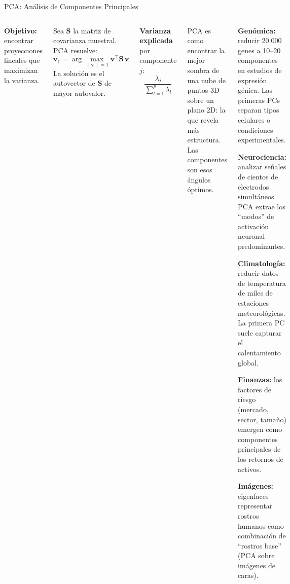 \documentclass[aspectratio=169]{beamer}
\begin{document}
\begin{frame}{PCA: Análisis de Componentes Principales}
\begin{columns}[T]
\textbf{Objetivo:} encontrar proyecciones lineales que maximizan la varianza.

\medskip
Sea $\mathbf{S}$ la matriz de covarianza muestral. PCA resuelve:
\[
\mathbf{v}_1 = \arg\max_{\|\mathbf{v}\|=1} \mathbf{v}^\top \mathbf{S}\, \mathbf{v}
\]
La solución es el autovector de $\mathbf{S}$ de mayor autovalor.

\medskip
\textbf{Varianza explicada} por componente $j$:
\[
\frac{\lambda_j}{\sum_{l=1}^p \lambda_l}
\]

\medskip
\begin{concepto}
PCA es como encontrar la mejor sombra de una nube de puntos 3D sobre un plano 2D: la que revela más estructura. Las componentes son esos ángulos óptimos.
\end{concepto}

\begin{aplicacion}
\textbf{Genómica:} reducir 20.000 genes a 10--20 componentes en estudios de expresión génica. Las primeras PCs separan tipos celulares o condiciones experimentales.

\medskip
\textbf{Neurociencia:} analizar señales de cientos de electrodos simultáneos. PCA extrae los ``modos'' de activación neuronal predominantes.

\medskip
\textbf{Climatología:} reducir datos de temperatura de miles de estaciones meteorológicas. La primera PC suele capturar el calentamiento global.

\medskip
\textbf{Finanzas:} los factores de riesgo (mercado, sector, tamaño) emergen como componentes principales de los retornos de activos.

\medskip
\textbf{Imágenes:} eigenfaces -- representar rostros humanos como combinación de ``rostros base'' (PCA sobre imágenes de caras).
\end{aplicacion}
\end{columns}
\end{frame}
\end{document}
